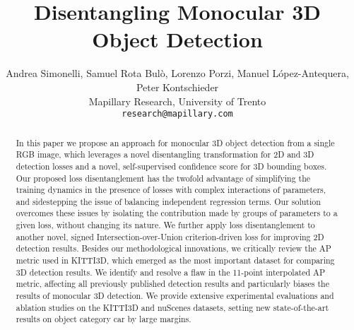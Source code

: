 \documentclass[10pt,twocolumn,letterpaper]{article}
\begin{document}
\title{
\vspace{-20pt}
Disentangling Monocular 3D Object Detection\\
}


\author{Andrea Simonelli, Samuel Rota Bul\`o, Lorenzo Porzi, Manuel L\'opez-Antequera, Peter Kontschieder\\
Mapillary Research, University of Trento \\
{\tt\small research@mapillary.com}\\
}


\maketitle



\begin{abstract}
In this paper we propose an approach for monocular 3D object detection from a single RGB image, which leverages a novel disentangling transformation for 2D and 3D detection losses and a novel, self-supervised confidence score for 3D bounding boxes. Our proposed loss disentanglement has the twofold advantage of simplifying the training dynamics in the presence of losses with complex interactions of parameters, and sidestepping the issue of balancing independent regression terms. Our solution overcomes these issues by isolating the contribution made by groups of parameters to a given loss, without changing its nature. We further apply loss disentanglement to another novel, signed Intersection-over-Union criterion-driven loss for improving 2D detection results. Besides our methodological innovations, we critically review the AP metric used in KITTI3D, which emerged as the most important dataset for comparing 3D detection results. We identify and resolve a flaw in the 11-point interpolated AP metric, affecting all previously published detection results and particularly biases the results of monocular 3D detection. We provide extensive experimental evaluations and ablation studies on the KITTI3D and nuScenes datasets, setting new state-of-the-art results on object category car by large margins.
\end{abstract}
\end{document}
